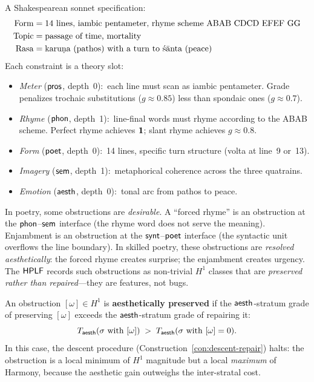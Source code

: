 \begin{example}
\label{ex:sonnet}
A Shakespearean sonnet specification:
\begin{align*}
  \mathrm{Form} &= \text{14 lines, iambic pentameter,
    rhyme scheme ABAB CDCD EFEF GG} \\
  \mathrm{Topic} &= \text{passage of time, mortality} \\
  \mathrm{Rasa} &= \text{karu\d{n}a (pathos) with
    a turn to \'s\=anta (peace)}
\end{align*}
Each constraint is a theory slot:
\begin{itemize}[nosep]
\item \emph{Meter} ($\mathsf{pros}$, depth~0):\ each line must scan as
  iambic pentameter.  Grade penalizes trochaic substitutions
  ($g \approx 0.85$) less than spondaic ones ($g \approx 0.7$).
\item \emph{Rhyme} ($\mathsf{phon}$, depth~1):\ line-final words must
  rhyme according to the ABAB scheme.  Perfect rhyme achieves
  $\mathbf{1}$; slant rhyme achieves $g \approx 0.8$.
\item \emph{Form} ($\mathsf{poet}$, depth~0):\ 14 lines, specific turn
  structure (volta at line~9 or~13).
\item \emph{Imagery} ($\mathsf{sem}$, depth~1):\ metaphorical coherence
  across the three quatrains.
\item \emph{Emotion} ($\mathsf{aesth}$, depth~0):\ tonal arc from pathos
  to peace.
\end{itemize}
\end{example}

\begin{remark}
In poetry, some obstructions are \emph{desirable}.  A
``forced rhyme'' is an obstruction at the $\mathsf{phon}$--$\mathsf{sem}$ interface
(the rhyme word does not serve the meaning).  Enjambment is an
obstruction at the $\mathsf{synt}$--$\mathsf{poet}$ interface (the syntactic unit
overflows the line boundary).  In skilled poetry, these obstructions
are \emph{resolved aesthetically}: the forced rhyme creates surprise;
the enjambment creates urgency.  The $\mathsf{HPLF}$ records such
obstructions as non-trivial $H^1$ classes that are \emph{preserved
rather than repaired}---they are features, not bugs.
\end{remark}

\begin{proposition}
\label{prop:preserved-obstructions}
An obstruction $[\omega] \in H^1$ is \textbf{aesthetically preserved}
if the $\mathsf{aesth}$-stratum grade of preserving $[\omega]$ exceeds the
$\mathsf{aesth}$-stratum grade of repairing it:
\[
  T_{\mathsf{aesth}}(\sigma \text{ with } [\omega]) \;>\;
  T_{\mathsf{aesth}}(\sigma \text{ with } [\omega] = 0).
\]
In this case, the descent procedure
(Construction~\ref{con:descent-repair}) halts: the obstruction is a
local minimum of $H^1$ magnitude but a local \emph{maximum} of
Harmony, because the aesthetic gain outweighs the inter-stratal cost.
\end{proposition}

